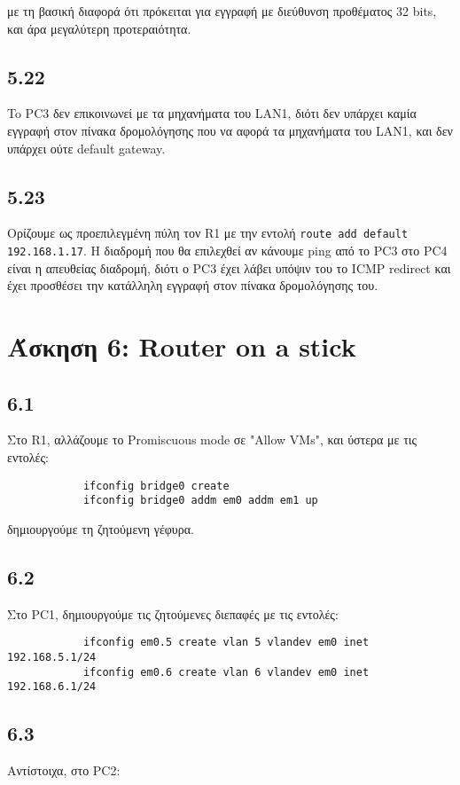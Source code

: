 \documentclass[a4paper, 12pt]{article}
\begin{document}
		με τη βασική διαφορά ότι πρόκειται για εγγραφή με διεύθυνση προθέματος 32 bits, και άρα μεγαλύτερη προτεραιότητα.
		
	\subsection*{5.22} 
		To PC3 δεν επικοινωνεί με τα μηχανήματα του LAN1, διότι δεν υπάρχει καμία εγγραφή στον πίνακα δρομολόγησης που να αφορά τα μηχανήματα του LAN1, και δεν υπάρχει ούτε default gateway.
	
	\subsection*{5.23} 
		Ορίζουμε ως προεπιλεγμένη πύλη τον R1 με την εντολή \verb|route add default 192.168.1.17|. Η διαδρομή που θα επιλεχθεί αν κάνουμε ping από το PC3 στο PC4 είναι η απευθείας διαδρομή, διότι ο PC3 έχει λάβει υπόψιν του το ICMP redirect και έχει προσθέσει την κατάλληλη εγγραφή στον πίνακα δρομολόγησης του.
		
\section*{Άσκηση 6: Router on a stick}

	\subsection*{6.1}
		Στο R1, αλλάζουμε το Promiscuous mode σε "Allow VMs", και ύστερα με τις εντολές:
		
		\begin{verbatim}
			ifconfig bridge0 create
			ifconfig bridge0 addm em0 addm em1 up
		\end{verbatim}
		
		δημιουργούμε τη ζητούμενη γέφυρα.

	\subsection*{6.2}
		Στο PC1, δημιουργούμε τις ζητούμενες διεπαφές με τις εντολές:
		
		\begin{verbatim}
			ifconfig em0.5 create vlan 5 vlandev em0 inet 192.168.5.1/24
			ifconfig em0.6 create vlan 6 vlandev em0 inet 192.168.6.1/24
		\end{verbatim}

	\subsection*{6.3}
		Αντίστοιχα, στο PC2:
		
\end{document}

